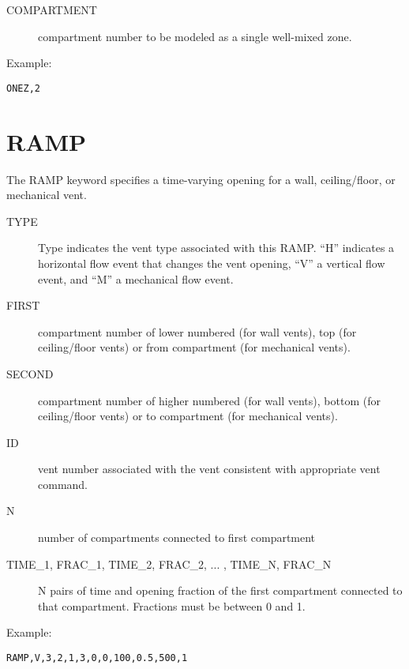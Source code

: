 \begin{adjustwidth}{1cm}{0cm}
\begin{description}
  \item[COMPARTMENT] compartment number to be modeled as a single well-mixed zone.
\end{description}
\end{adjustwidth}

\noindent Example:

\begin{lstlisting}
ONEZ,2
\end{lstlisting}

\section{RAMP}

The RAMP keyword specifies a time-varying opening for a wall, ceiling/floor, or mechanical vent.

\begin{adjustwidth}{1cm}{0cm}
\begin{description}
  \item[TYPE] Type indicates the vent type associated with this RAMP. ``H'' indicates a horizontal flow event that changes the vent opening, ``V'' a vertical flow event, and ``M'' a mechanical flow event.
  \item[FIRST] compartment number of lower numbered (for wall vents), top (for ceiling/floor vents) or from compartment (for mechanical vents).
  \item[SECOND] compartment number of higher numbered (for wall vents), bottom (for ceiling/floor vents) or to compartment (for mechanical vents).
  \item[ID] vent number associated with the vent consistent with appropriate vent command.
  \item[N] number of compartments connected to first compartment
  \item[TIME\_1, FRAC\_1, TIME\_2, FRAC\_2, ... ,  TIME\_N, FRAC\_N] N pairs of time and opening fraction of the first compartment connected to that compartment. Fractions must be between 0 and 1.
\end{description}
\end{adjustwidth}

\noindent Example:

\begin{lstlisting}
RAMP,V,3,2,1,3,0,0,100,0.5,500,1
\end{lstlisting}

